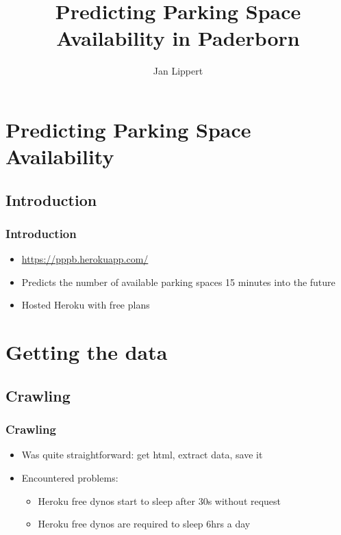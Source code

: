 \documentclass[11pt]{beamer}
\begin{document}
\author{Jan Lippert}
\title{Predicting Parking Space Availability in Paderborn}
\frame[plain]{\maketitle}



\section{Predicting Parking Space Availability}
\subsection{Introduction}
\begin{frame}
  \frametitle{Introduction}
  \begin{itemize}
  	\item \url{https://pppb.herokuapp.com/}
  	\item Predicts the number of available parking spaces 15 minutes into the future
  	\item Hosted Heroku with free plans
  \end{itemize}
\end{frame}

\section{Getting the data}
\subsection{Crawling}
\begin{frame}
  \frametitle{Crawling}
  \begin{itemize}
  	\item Was quite straightforward: get html, extract data, save it
  	\item Encountered problems: 
  	\begin{itemize}
  	  \item Heroku free dynos start to sleep after 30s without request
  	  \item Heroku free dynos are required to sleep 6hrs a day
  	\end{itemize}
  \end{itemize}
\end{frame}
\end{document}

